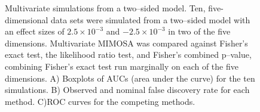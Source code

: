 \documentclass[11pt]{article}
\begin{document}
\begin{figure}[htbp] %
   \centering
{}
   \caption{Multivariate simulations from a two--sided model. Ten, five-dimensional data sets were simulated from a two--sided model with an effect sizes of $2.5\times 10^{-3}$ and $-2.5\times 10^{-3}$ in two of the five dimensions. Multivariate MIMOSA was compared against Fisher's exact test, the likelihood ratio test, and Fisher's combined p--value, combining Fisher's exact test run marginally on each of the five dimensions. A) Boxplots of AUCs (area under the curve) for the ten simulations. B) Observed and nominal false discovery rate for each method. C)ROC curves for the competing methods.}
   \label{fig:mvsimulations}
\end{figure}
\end{document}
